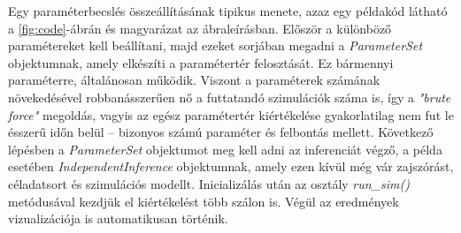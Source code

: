 Egy paraméterbecslés összeállításának tipikus menete, azaz egy példakód látható a \ref{fig:code}-ábrán és magyarázat az ábraleírásban. Először a különböző paramétereket kell beállítani, majd ezeket sorjában megadni a \textit{ParameterSet} objektumnak, amely elkészíti a paramétertér felosztását. Ez bármennyi paraméterre, általánosan működik. Viszont a paraméterek számának növekedésével robbanásszerűen nő a futtatandó szimulációk száma is, így a \textit{"brute force"} megoldás, vagyis az egész paramétertér kiértékelése gyakorlatilag nem fut le ésszerű időn belül -- bizonyos számú paraméter és felbontás mellett. Következő lépésben a \textit{ParameterSet} objektumot meg kell adni az inferenciát végző, a példa esetében \textit{IndependentInference} objektumnak, amely ezen kívül még vár zajszórást, céladatsort és szimulációs modellt. Inicializálás után az osztály \textit{run\_sim()} metódusával kezdjük el kiértékelést több szálon is. Végül az eredmények vizualizációja is automatikusan történik.

